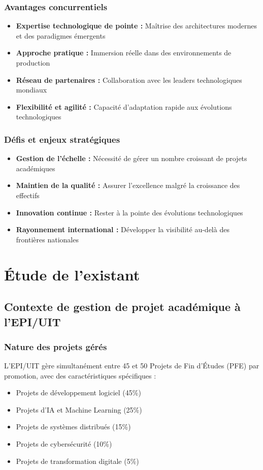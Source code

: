 \subsubsection{Avantages concurrentiels}
\begin{itemize}
    \item \textbf{Expertise technologique de pointe :} Maîtrise des architectures modernes et des paradigmes émergents
    \item \textbf{Approche pratique :} Immersion réelle dans des environnements de production
    \item \textbf{Réseau de partenaires :} Collaboration avec les leaders technologiques mondiaux
    \item \textbf{Flexibilité et agilité :} Capacité d'adaptation rapide aux évolutions technologiques
\end{itemize}

\subsubsection{Défis et enjeux stratégiques}
\begin{itemize}
    \item \textbf{Gestion de l'échelle :} Nécessité de gérer un nombre croissant de projets académiques
    \item \textbf{Maintien de la qualité :} Assurer l'excellence malgré la croissance des effectifs
    \item \textbf{Innovation continue :} Rester à la pointe des évolutions technologiques
    \item \textbf{Rayonnement international :} Développer la visibilité au-delà des frontières nationales
\end{itemize}

\section{Étude de l'existant}

\subsection{Contexte de gestion de projet académique à l'EPI/UIT}

\subsubsection{Nature des projets gérés}
L'EPI/UIT gère simultanément entre 45 et 50 Projets de Fin d'Études (PFE) par promotion, avec des caractéristiques spécifiques :
\begin{itemize}
    \item Projets de développement logiciel (45\%)
    \item Projets d'IA et Machine Learning (25\%)
    \item Projets de systèmes distribués (15\%)
    \item Projets de cybersécurité (10\%)
    \item Projets de transformation digitale (5\%)
\end{itemize}

